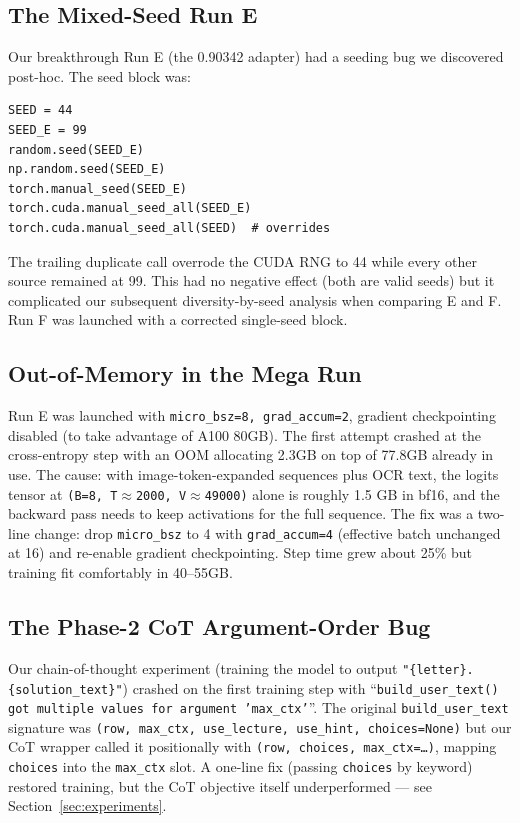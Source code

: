 \documentclass[11pt]{article}
\begin{document}
\subsection{The Mixed-Seed Run E}
Our breakthrough Run E (the 0.90342 adapter) had a seeding bug we discovered post-hoc. The seed block was:
\begin{verbatim}
SEED = 44
SEED_E = 99
random.seed(SEED_E)
np.random.seed(SEED_E)
torch.manual_seed(SEED_E)
torch.cuda.manual_seed_all(SEED_E)
torch.cuda.manual_seed_all(SEED)  # overrides
\end{verbatim}
The trailing duplicate call overrode the CUDA RNG to 44 while every other source remained at 99. This had no negative effect (both are valid seeds) but it complicated our subsequent diversity-by-seed analysis when comparing E and F. Run F was launched with a corrected single-seed block.

\subsection{Out-of-Memory in the Mega Run}
Run E was launched with \texttt{micro\_bsz=8, grad\_accum=2}, gradient checkpointing disabled (to take advantage of A100 80GB). The first attempt crashed at the cross-entropy step with an OOM allocating 2.3GB on top of 77.8GB already in use. The cause: with image-token-expanded sequences plus OCR text, the logits tensor at \texttt{(B=8, T$\approx$2000, V$\approx$49000)} alone is roughly 1.5 GB in bf16, and the backward pass needs to keep activations for the full sequence. The fix was a two-line change: drop \texttt{micro\_bsz} to 4 with \texttt{grad\_accum=4} (effective batch unchanged at 16) and re-enable gradient checkpointing. Step time grew about 25\% but training fit comfortably in 40--55GB.

\subsection{The Phase-2 CoT Argument-Order Bug}
Our chain-of-thought experiment (training the model to output \texttt{"\{letter\}. \{solution\_text\}"}) crashed on the first training step with ``\texttt{build\_user\_text() got multiple values for argument 'max\_ctx'}''. The original \texttt{build\_user\_text} signature was \texttt{(row, max\_ctx, use\_lecture, use\_hint, choices=None)} but our CoT wrapper called it positionally with \texttt{(row, choices, max\_ctx=\dots)}, mapping \texttt{choices} into the \texttt{max\_ctx} slot. A one-line fix (passing \texttt{choices} by keyword) restored training, but the CoT objective itself underperformed --- see Section~\ref{sec:experiments}.
\end{document}
